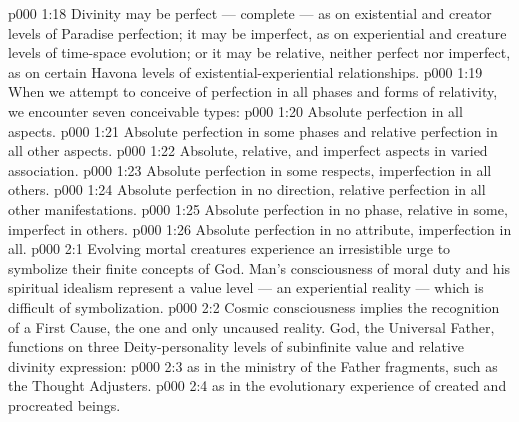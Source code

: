 \vs p000 1:18 Divinity may be perfect --- complete --- as on existential and creator levels of Paradise perfection; it may be imperfect, as on experiential and creature levels of time\hyp{}space evolution; or it may be relative, neither perfect nor imperfect, as on certain Havona levels of existential\hyp{}experiential relationships.
\vs p000 1:19 \pc When we attempt to conceive of perfection in all phases and forms of relativity, we encounter seven conceivable types:
\vs p000 1:20 \bibnobreakspace Absolute perfection in all aspects.
\vs p000 1:21 \bibnobreakspace Absolute perfection in some phases and relative perfection in all other aspects.
\vs p000 1:22 \bibnobreakspace Absolute, relative, and imperfect aspects in varied association.
\vs p000 1:23 \bibnobreakspace Absolute perfection in some respects, imperfection in all others.
\vs p000 1:24 \bibnobreakspace Absolute perfection in no direction, relative perfection in all other manifestations.
\vs p000 1:25 \bibnobreakspace Absolute perfection in no phase, relative in some, imperfect in others.
\vs p000 1:26 \bibnobreakspace Absolute perfection in no attribute, imperfection in all.
\vs p000 2:1 Evolving mortal creatures experience an irresistible urge to symbolize their finite concepts of God. Man’s consciousness of moral duty and his spiritual idealism represent a value level --- an experiential reality --- which is difficult of symbolization.
\vs p000 2:2 Cosmic consciousness implies the recognition of a First Cause, the one and only uncaused reality. God, the Universal Father, functions on three Deity\hyp{}personality levels of subinfinite value and relative divinity expression:
\vs p000 2:3 \bibnobreakspace {} as in the ministry of the Father fragments, such as the Thought Adjusters.
\vs p000 2:4 \bibnobreakspace {} as in the evolutionary experience of created and procreated beings.
